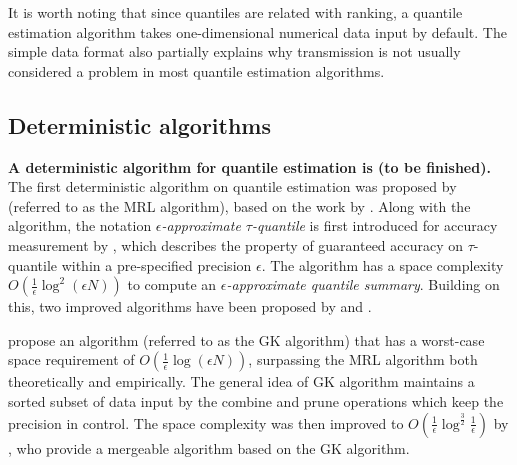 It is worth noting that since quantiles are related with ranking, a quantile estimation algorithm takes one-dimensional numerical data input by default. The simple data format also partially explains why transmission is not usually considered a problem in most quantile estimation algorithms.
\subsection{Deterministic algorithms}
\label{deterministic}
\textbf{A deterministic algorithm for quantile estimation is (to be finished).}
The first deterministic algorithm on quantile estimation was proposed by \citeauthor{mankuApproximateMediansOther1998}\cite{mankuApproximateMediansOther1998} (referred to as the MRL algorithm), based on the work by \citeauthor{munroSelectionSortingLimited1980}\cite{munroSelectionSortingLimited1980}. Along with the algorithm, the notation \textit{$\epsilon$-approximate $\tau$-quantile} is first introduced for accuracy measurement by \citeauthor{mankuApproximateMediansOther1998}, which describes the property of guaranteed accuracy on $\tau$-quantile within a pre-specified precision $\epsilon$. The algorithm has a space complexity $O(\frac{1}{\epsilon}\log^2 (\epsilon N))$ to compute an \textit{$\epsilon$-approximate quantile summary}. Building on this, two improved algorithms have been proposed by \citeauthor{greenwaldQuantilesEquidepthHistograms2016a}\cite{greenwaldQuantilesEquidepthHistograms2016a} and \citeauthor{shrivastavaMediansNewAggregation2004b}\cite{shrivastavaMediansNewAggregation2004b}.

\citeauthor{greenwaldQuantilesEquidepthHistograms2016a}\cite{greenwaldQuantilesEquidepthHistograms2016a} propose an algorithm (referred to as the GK algorithm) that has a worst-case space requirement of $O(\frac{1}{\epsilon}\log(\epsilon N))$, surpassing the MRL algorithm both theoretically and empirically. The general idea of GK algorithm maintains a sorted subset of data input by the combine and prune operations which keep the precision in control. The space complexity was then improved to 
$O(\frac{1}{\epsilon}\log^{\frac{3}{2}}\frac{1}{\epsilon})$ by \citeauthor{agarwalMergeableSummaries2013}\cite{agarwalMergeableSummaries2013}, who provide a mergeable algorithm based on the GK algorithm.

